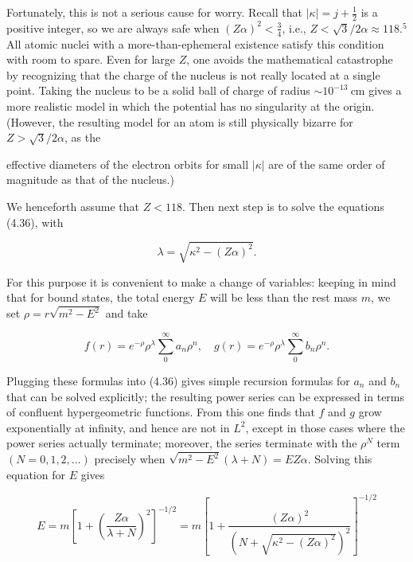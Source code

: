 \documentclass[10pt, letterpaper]{article}
\begin{document}
Fortunately, this is not a serious cause for worry. Recall that $|\kappa|=j+\frac{1}{2}$ is a positive integer, so we are always safe when $(Z \alpha)^{2}<\frac{3}{4}$, i.e., $Z<\sqrt{3} / 2 \alpha \approx 118 .^{5}$ All atomic nuclei with a more-than-ephemeral existence satisfy this condition with room to spare. Even for large $Z$, one avoids the mathematical catastrophe by recognizing that the charge of the nucleus is not really located at a single point. Taking the nucleus to be a solid ball of charge of radius $\sim 10^{-13} \mathrm{~cm}$ gives a more realistic model in which the potential has no singularity at the origin. (However, the resulting model for an atom is still physically bizarre for $Z>\sqrt{3} / 2 \alpha$, as the

effective diameters of the electron orbits for small $|\kappa|$ are of the same order of magnitude as that of the nucleus.)

We henceforth assume that $Z<118$. Then next step is to solve the equations (4.36), with

$$
\lambda=\sqrt{\kappa^{2}-(Z \alpha)^{2}} .
$$

For this purpose it is convenient to make a change of variables: keeping in mind that for bound states, the total energy $E$ will be less than the rest mass $m$, we set $\rho=r \sqrt{m^{2}-E^{2}}$ and take

$$
f(r)=e^{-\rho} \rho^{\lambda} \sum_{0}^{\infty} a_{n} \rho^{n}, \quad g(r)=e^{-\rho} \rho^{\lambda} \sum_{0}^{\infty} b_{n} \rho^{n} .
$$

Plugging these formulas into (4.36) gives simple recursion formulas for $a_{n}$ and $b_{n}$ that can be solved explicitly; the resulting power series can be expressed in terms of confluent hypergeometric functions. From this one finds that $f$ and $g$ grow exponentially at infinity, and hence are not in $L^{2}$, except in those cases where the power series actually terminate; moreover, the series terminate with the $\rho^{N}$ term $(N=0,1,2, \ldots)$ precisely when $\sqrt{m^{2}-E^{2}}(\lambda+N)=E Z \alpha$. Solving this equation for $E$ gives

$$
E=m\left[1+\left(\frac{Z \alpha}{\lambda+N}\right)^{2}\right]^{-1 / 2}=m\left[1+\frac{(Z \alpha)^{2}}{\left(N+\sqrt{\kappa^{2}-(Z \alpha)^{2}}\right)^{2}}\right]^{-1 / 2}
$$
\end{document}

